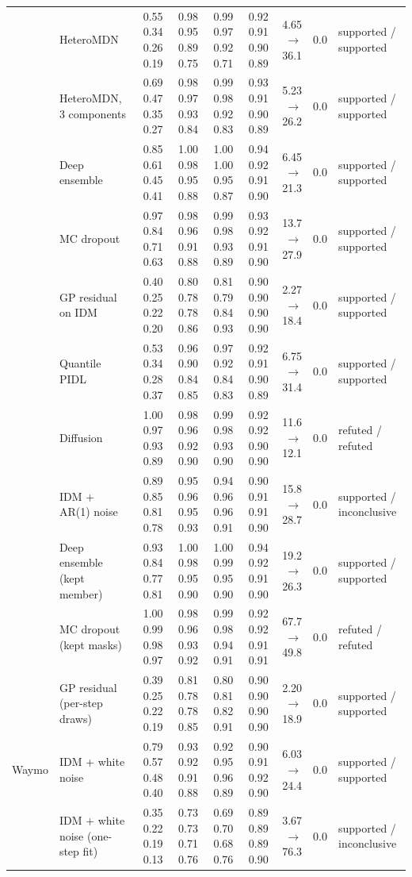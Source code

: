 \begin{longtable}{llrrrrrrl}
 & HeteroMDN & 0.55 0.34 0.26 0.19 & 0.98 0.95 0.89 0.75 & 0.99 0.97 0.92 0.71 & 0.92 0.91 0.90 0.89 & 4.65 $\rightarrow$ 36.1 & 0.0 & supported / supported \\
 & HeteroMDN, 3 components & 0.69 0.47 0.35 0.27 & 0.98 0.97 0.93 0.84 & 0.99 0.98 0.92 0.83 & 0.93 0.91 0.90 0.89 & 5.23 $\rightarrow$ 26.2 & 0.0 & supported / supported \\
 & Deep ensemble & 0.85 0.61 0.45 0.41 & 1.00 0.98 0.95 0.88 & 1.00 1.00 0.95 0.87 & 0.94 0.92 0.91 0.90 & 6.45 $\rightarrow$ 21.3 & 0.0 & supported / supported \\
 & MC dropout & 0.97 0.84 0.71 0.63 & 0.98 0.96 0.91 0.88 & 0.99 0.98 0.93 0.89 & 0.93 0.92 0.91 0.90 & 13.7 $\rightarrow$ 27.9 & 0.0 & supported / supported \\
 & GP residual on IDM & 0.40 0.25 0.22 0.20 & 0.80 0.78 0.78 0.86 & 0.81 0.79 0.84 0.93 & 0.90 0.90 0.90 0.90 & 2.27 $\rightarrow$ 18.4 & 0.0 & supported / supported \\
 & Quantile PIDL & 0.53 0.34 0.28 0.37 & 0.96 0.90 0.84 0.85 & 0.97 0.92 0.84 0.83 & 0.92 0.91 0.90 0.89 & 6.75 $\rightarrow$ 31.4 & 0.0 & supported / supported \\
 & Diffusion & 1.00 0.97 0.93 0.89 & 0.98 0.96 0.92 0.90 & 0.99 0.98 0.93 0.90 & 0.92 0.92 0.90 0.90 & 11.6 $\rightarrow$ 12.1 & 0.0 & refuted / refuted \\
 & IDM + AR(1) noise & 0.89 0.85 0.81 0.78 & 0.95 0.96 0.95 0.93 & 0.94 0.96 0.96 0.91 & 0.90 0.91 0.91 0.90 & 15.8 $\rightarrow$ 28.7 & 0.0 & supported / inconclusive \\
 & Deep ensemble (kept member) & 0.93 0.84 0.77 0.81 & 1.00 0.98 0.95 0.90 & 1.00 0.99 0.95 0.90 & 0.94 0.92 0.91 0.90 & 19.2 $\rightarrow$ 26.3 & 0.0 & supported / supported \\
 & MC dropout (kept masks) & 1.00 0.99 0.98 0.97 & 0.98 0.96 0.93 0.92 & 0.99 0.98 0.94 0.91 & 0.92 0.92 0.91 0.91 & 67.7 $\rightarrow$ 49.8 & 0.0 & refuted / refuted \\
 & GP residual (per-step draws) & 0.39 0.25 0.22 0.19 & 0.81 0.78 0.78 0.85 & 0.80 0.81 0.82 0.91 & 0.90 0.90 0.90 0.90 & 2.20 $\rightarrow$ 18.9 & 0.0 & supported / supported \\
\midrule
Waymo & IDM + white noise & 0.79 0.57 0.48 0.40 & 0.93 0.92 0.91 0.88 & 0.92 0.95 0.96 0.89 & 0.90 0.91 0.92 0.90 & 6.03 $\rightarrow$ 24.4 & 0.0 & supported / supported \\
 & IDM + white noise (one-step fit) & 0.35 0.22 0.19 0.13 & 0.73 0.73 0.71 0.76 & 0.69 0.70 0.68 0.76 & 0.89 0.89 0.89 0.90 & 3.67 $\rightarrow$ 76.3 & 0.0 & supported / inconclusive \\

\end{longtable}
